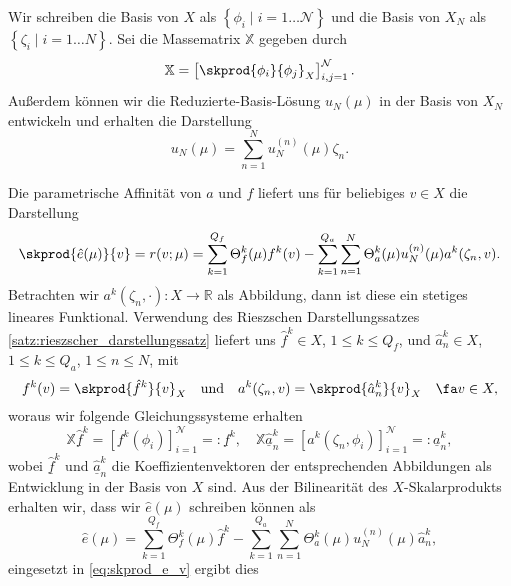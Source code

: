 Wir schreiben die Basis von $X$ als $\left\{ \phi_i \mid i = 1 \ldots \mathcal N \right\}$ und die Basis von $X_N$ als $\left\{ \zeta_i \mid i = 1 \ldots N \right\}$.
Sei die Massematrix $\mathbb{X}$ gegeben durch
\begin{equation}
    \mathbb{X} = \left[ \skprod{\phi_i}{\phi_j}_X \right]_{i,j=1}^{\mathcal N}.
\end{equation}
Außerdem können wir die Reduzierte-Basis-Lösung $u_N(\mu)$ in der Basis von $X_N$ entwickeln und erhalten die Darstellung
\begin{equation}
    u_N(\mu) = \sum_{n=1}^{N} u_N^{(n)}(\mu) \zeta_n.
\end{equation}

Die parametrische Affinität von $a$ und $f$ liefert uns für beliebiges $v \in X$ die Darstellung
\begin{equation}
    \label{eq:skprod_e_v}
    \skprod{\hat e(\mu)}{v} = r(v; \mu) = \sum_{k=1}^{Q_f} \Theta_f^k(\mu) f^k(v) - \sum_{k=1}^{Q_a} \sum_{n=1}^{N} \Theta_a^k(\mu) u_N^{(n)}(\mu)a^k(\zeta_n, v).
\end{equation}
Betrachten wir $a^k(\zeta_n, \cdot) \colon X \to \mathbb{R}$ als Abbildung, dann ist diese ein stetiges lineares Funktional. Verwendung des Rieszschen Darstellungssatzes \ref{satz:rieszscher_darstellungssatz} liefert uns $\hat f^k \in X$, $1 \leq k \leq Q_f$, und $\hat a^k_n \in X$, $1 \leq k \leq Q_a$, $1 \leq n \leq N$, mit
\begin{equation}
    f^k(v) = \skprod{\hat f^k}{v}_X \quad\text{und}\quad a^k(\zeta_n, v) = \skprod{\hat a^k_n}{v}_X \quad \fa v \in X,
\end{equation}
woraus wir folgende Gleichungssysteme erhalten
\begin{equation}
    \label{eq:Xf_eq_f_and_Xa_eq_a}
    \mathbb{X} \underline{\hat{f}}^k = [f^k(\phi_i)]_{i=1}^{\mathcal N} =: \underline f^k, \quad \mathbb{X} \underline{\hat{a}}^k_n = [a^k(\zeta_n, \phi_i)]_{i=1}^{\mathcal N} =: \underline a^k_n,
\end{equation}
wobei $\underline{\hat{f}}^k$ und $\underline{\hat{a}}^k_n$ die Koeffizientenvektoren der entsprechenden Abbildungen als Entwicklung in der Basis von $X$ sind.
Aus der Bilinearität des $X$-Skalarprodukts erhalten wir, dass wir $\hat e(\mu)$ schreiben können als
\begin{equation}
    \hat e(\mu) = \sum_{k=1}^{Q_f} \Theta_f^k(\mu) \hat f^k - \sum_{k=1}^{Q_a} \sum_{n=1}^{N} \Theta_a^k(\mu) u_N^{(n)}(\mu) \hat a^k_n,
\end{equation}
eingesetzt in \eqref{eq:skprod_e_v} ergibt dies
